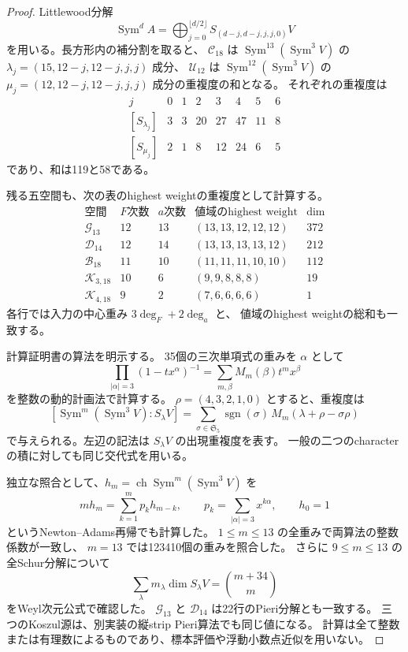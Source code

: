 \begin{proof}
Littlewood分解
\[
\operatorname{Sym}^d A=
\bigoplus_{j=0}^{\lfloor d/2\rfloor}
 S_{(d-j,d-j,j,j,0)}V
\]
を用いる。長方形内の補分割を取ると、
$\mathcal C_{18}$ は
$\operatorname{Sym}^{13}(\operatorname{Sym}^3V)$ の
$\lambda_j=(15,12-j,12-j,j,j)$ 成分、
$\mathcal U_{12}$ は
$\operatorname{Sym}^{12}(\operatorname{Sym}^3V)$ の
$\mu_j=(12,12-j,12-j,j,j)$ 成分の重複度の和となる。
それぞれの重複度は
\[
\begin{array}{c|rrrrrrr}
j&0&1&2&3&4&5&6\\\hline
[S_{\lambda_j}]&3&3&20&27&47&11&8\\
{}[S_{\mu_j}]&2&1&8&12&24&6&5
\end{array}
\]
であり、和は119と58である。

残る五空間も、次の表のhighest weightの重複度として計算する。
\[
\begin{array}{c|rr|c|r}
\text{空間}&F\text{次数}&a\text{次数}&\text{値域のhighest weight}&\dim\\\hline
\mathcal G_{13}&12&13&(13,13,12,12,12)&372\\
\mathcal D_{14}&12&14&(13,13,13,13,12)&212\\
\mathcal B_{18}&11&10&(11,11,11,10,10)&112\\
\mathcal K_{3,18}&10&6&(9,9,8,8,8)&19\\
\mathcal K_{4,18}&9&2&(7,6,6,6,6)&1
\end{array}
\]
各行では入力の中心重み $3\deg_F+2\deg_a$ と、
値域のhighest weightの総和も一致する。

計算証明書の算法を明示する。
35個の三次単項式の重みを $\alpha$ として
\[
 \prod_{|\alpha|=3}(1-tx^\alpha)^{-1}
 =\sum_{m,\beta}M_m(\beta)t^mx^\beta
\]
を整数の動的計画法で計算する。
$\rho=(4,3,2,1,0)$ とすると、重複度は
\[
 [\operatorname{Sym}^m(\operatorname{Sym}^3V):S_\lambda V]
 =\sum_{\sigma\in\mathfrak S_5}
  \operatorname{sgn}(\sigma)\,
  M_m(\lambda+\rho-\sigma\rho)
\]
で与えられる。左辺の記法は $S_\lambda V$ の出現重複度を表す。
一般の二つのcharacterの積に対しても同じ交代式を用いる。

独立な照合として、$h_m=\operatorname{ch}\operatorname{Sym}^m
(\operatorname{Sym}^3V)$ を
\[
 m h_m=\sum_{k=1}^m p_kh_{m-k},\qquad
 p_k=\sum_{|\alpha|=3}x^{k\alpha},\qquad h_0=1
\]
というNewton--Adams再帰でも計算した。
$1\le m\le13$ の全重みで両算法の整数係数が一致し、
$m=13$ では123410個の重みを照合した。
さらに $9\le m\le13$ の全Schur分解について
\[
 \sum_\lambda m_\lambda\dim S_\lambda V=\binom{m+34}{m}
\]
をWeyl次元公式で確認した。
$\mathcal G_{13}$ と $\mathcal D_{14}$ は22行のPieri分解とも一致する。
三つのKoszul源は、別実装の縦strip Pieri算法でも同じ値になる。
計算は全て整数または有理数によるものであり、標本評価や浮動小数点近似を用いない。
\end{proof}

